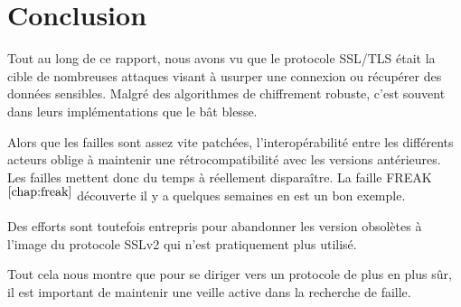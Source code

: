 \chapter*{Conclusion}
\label{chapter:ccl}

Tout au long de ce rapport, nous avons vu que le protocole SSL/TLS était la cible de nombreuses attaques visant à usurper une connexion ou récupérer des données sensibles. Malgré des algorithmes de chiffrement robuste, c'est souvent dans leurs implémentations que le bât blesse.

Alors que les failles sont assez vite patchées, l'interopérabilité entre les différents acteurs oblige à maintenir
une rétrocompatibilité avec les versions antérieures. Les failles mettent donc du temps à réellement disparaître.
La faille FREAK$^{\ref{chap:freak}}$ découverte il y a quelques semaines en est un bon exemple.

Des efforts sont toutefois entrepris pour abandonner les version obsolètes à l'image du protocole SSLv2 qui n'est
pratiquement plus utilisé.

Tout cela nous montre que pour se diriger vers un protocole de plus en plus sûr, il est important de maintenir une veille active dans la recherche de faille. 
